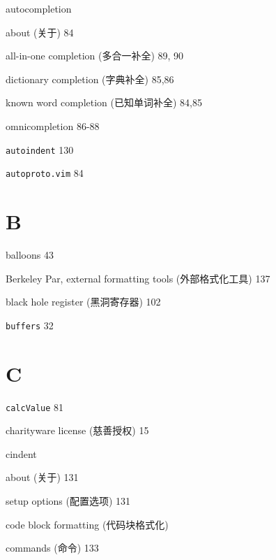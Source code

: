 \begin{multicols}{2}
\hangindent=2pc  autocompletion \par
\hangindent=2pc \quad about (关于) 84 \par
\hangindent=2pc \quad all-in-one completion (多合一补全) 89, 90 \par
\hangindent=2pc \quad dictionary completion (字典补全) 85,86 \par
\hangindent=2pc \quad known word completion (已知单词补全) 84,85 \par
\hangindent=2pc \quad omnicompletion 86-88 \par

\hangindent=2pc  \texttt{autoindent} 130

\hangindent=2pc  \texttt{autoproto.vim} 84

\hangindent=2pc  \section*{B}

\hangindent=2pc  balloons 43

\hangindent=2pc  Berkeley Par, external formatting tools (外部格式化工具) 137

\hangindent=2pc  black hole register (黑洞寄存器) 102

\hangindent=2pc  \texttt{buffers} 32

\hangindent=2pc  \section*{C}

\hangindent=2pc  \texttt{calcValue} 81

\hangindent=2pc  charityware license (慈善授权) 15

\hangindent=2pc  cindent \par
\hangindent=2pc \quad about (关于) 131 \par
\hangindent=2pc \quad setup options (配置选项) 131 \par

\hangindent=2pc  code block formatting (代码块格式化) \par
\hangindent=2pc \quad commands (命令) 133 \par


\end{multicols}
